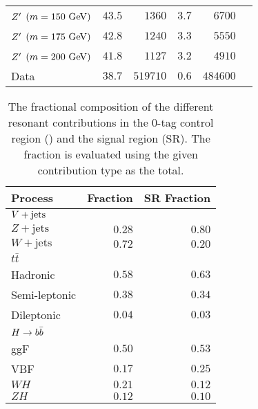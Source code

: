 \begin{table}[htpb]
\begin{adjustbox}{max width=\textwidth}
\begin{tabular}{@{}lrrrrr@{}}
   $Z^{\prime}$ $\left(m=150~\mathrm{GeV}\right)$ & $43.5$               & $1360$                       & $3.7$          & $6700$                  \\
   $Z^{\prime}$ $\left(m=175~\mathrm{GeV}\right)$ & $42.8$               & $1240$                       & $3.3$          & $5550$                  \\
   $Z^{\prime}$ $\left(m=200~\mathrm{GeV}\right)$ & $41.8$               & $1127$                       & $3.2$          & $4910$                  \\
   Data                                & $38.7$               & $519710$                     & $0.6$          & $484600$                \\
   \bottomrule
  \end{tabular}
 \end{adjustbox}
 \label{table:efficiencies_and_yields}
\end{table}

\begin{table}[htpb]
 \centering
 \caption[The fractional composition of the different resonant contributions in the $0$-tag control region and signal region.]{%
  The fractional composition of the different resonant contributions in the $0$-tag control region (\CRQCD{}) and the signal region (SR).
  The fraction is evaluated using the given contribution type as the total.}
 \begin{tabular}{@{}lrr@{}}
  \toprule
  Process                                   & \CRQCD{} Fraction & SR Fraction \\ \midrule
  $\Vjets$                                  &                   &             \\
  \phantom{$\Vjets$\quad} $Z+\mathrm{jets}$ & $0.28$            & $0.80$      \\
  \phantom{$\Vjets$\quad} $W+\mathrm{jets}$ & $0.72$            & $0.20$      \\
  $t\bar{t}$                                &                   &             \\
  \phantom{$t\bar{t}$\quad} Hadronic        & $0.58$            & $0.63$      \\
  \phantom{$t\bar{t}$\quad} Semi-leptonic   & $0.38$            & $0.34$      \\
  \phantom{$t\bar{t}$\quad} Dileptonic      & $0.04$            & $0.03$      \\
  $\Hbb$                                    &                   &             \\
  \phantom{$\Hbb$\quad} ggF                 & $0.50$            & $0.53$      \\
  \phantom{$\Hbb$\quad} VBF                 & $0.17$            & $0.25$      \\
  \phantom{$\Hbb$\quad} $WH$                & $0.21$            & $0.12$      \\
  \phantom{$\Hbb$\quad} $ZH$                & $0.12$            & $0.10$      \\
  \bottomrule
 \end{tabular}
 \label{table:fractional_composition}
\end{table}


